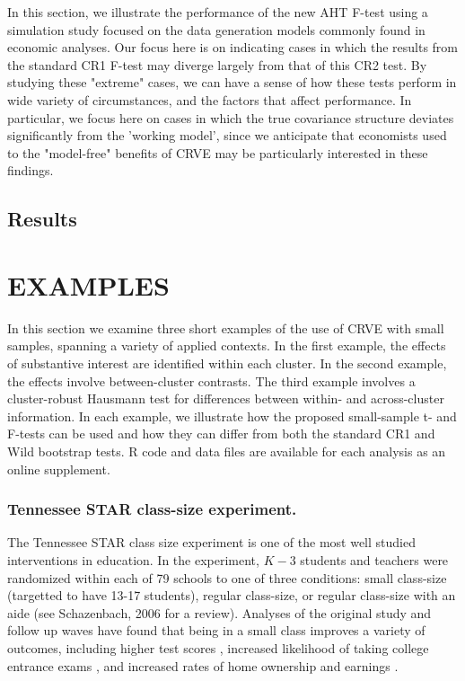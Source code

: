 \documentclass[12pt]{article}
\begin{document}
In this section, we illustrate the performance of the new AHT F-test using a simulation study focused on the data generation models commonly found in economic analyses.
Our focus here is on indicating cases in which the results from the standard CR1 F-test may diverge largely from that of this CR2 test.
By studying these "extreme" cases, we can have a sense of how these tests perform in wide variety of circumstances, and the factors that affect performance.
In particular, we focus here on cases in which the true covariance structure deviates significantly from the 'working model', since we anticipate that economists used to the "model-free" benefits of CRVE may be particularly interested in these findings. 


\subsection{Results}


\section{EXAMPLES}
\label{subsec:examples_F}


In this section we examine three short examples of the use of CRVE with small samples, spanning a variety of applied contexts. In the first example, the effects of substantive interest are identified within each cluster. In the second example, the effects involve between-cluster contrasts. The third example involves a cluster-robust Hausmann test for differences between within- and across-cluster information. In each example, we illustrate how the proposed small-sample t- and F-tests can be used and how they can differ from both the standard CR1 and Wild bootstrap tests. R code and data files are available for each analysis as an online supplement.

\subsubsection{Tennessee STAR class-size experiment.} 

The Tennessee STAR class size experiment is one of the most well studied interventions in education.  In the experiment, $K - 3$ students and teachers were randomized within each of 79 schools to one of three conditions: small class-size (targetted to have 13-17 students), regular class-size, or regular class-size with an aide (see Schazenbach, 2006 for a review). Analyses of the original study and follow up waves have found that being in a small class improves a variety of outcomes, including higher test scores \citep{Schanzenbach2006what}, increased likelihood of taking college entrance exams \citep{Krueger2001effect}, and increased rates of home ownership and earnings \citep{Chetty2011how}. 
\end{document}
